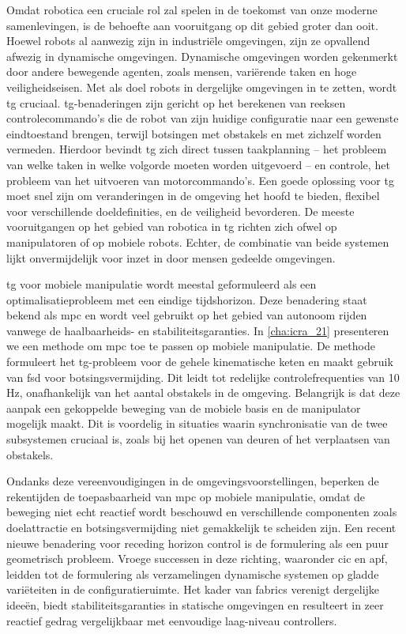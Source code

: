 \acresetall
Omdat robotica een cruciale rol zal spelen in de toekomst van onze moderne
samenlevingen, is de behoefte aan vooruitgang op dit gebied groter dan ooit.
Hoewel robots al aanwezig zijn in industriële omgevingen, zijn ze opvallend
afwezig in dynamische omgevingen. Dynamische omgevingen worden gekenmerkt door
andere bewegende agenten, zoals mensen, variërende taken en hoge
veiligheidseisen. Met als doel robots in dergelijke omgevingen in te zetten,
wordt \ac{tg} cruciaal. \Ac{tg}-benaderingen zijn gericht op het berekenen van
reeksen controlecommando's die de robot van zijn huidige configuratie naar een
gewenste eindtoestand brengen, terwijl botsingen met obstakels en met zichzelf
worden vermeden. Hierdoor bevindt \ac{tg} zich direct tussen taakplanning – het
probleem van welke taken in welke volgorde moeten worden uitgevoerd – en
controle, het probleem van het uitvoeren van motorcommando's. Een goede
oplossing voor \ac{tg} moet snel zijn om veranderingen in de omgeving het hoofd
te bieden, flexibel voor verschillende doeldefinities, en de veiligheid
bevorderen. De meeste vooruitgangen op het gebied van robotica in \ac{tg}
richten zich ofwel op manipulatoren of op mobiele robots. Echter, de combinatie
van beide systemen lijkt onvermijdelijk voor inzet in door mensen gedeelde
omgevingen.

\Ac{tg} voor mobiele manipulatie wordt meestal geformuleerd als een
optimalisatieprobleem met een eindige tijdshorizon. Deze benadering staat bekend
als \ac{mpc} en wordt veel gebruikt op het gebied van autonoom rijden vanwege de
haalbaarheids- en stabiliteitsgaranties. In \cref{cha:icra_21} presenteren we
een methode om \ac{mpc} toe te passen op mobiele manipulatie. De methode
formuleert het \ac{tg}-probleem voor de gehele kinematische keten en maakt
gebruik van \ac{fsd} voor botsingsvermijding. Dit leidt tot redelijke
controlefrequenties van 10 Hz, onafhankelijk van het aantal obstakels in de
omgeving. Belangrijk is dat deze aanpak een gekoppelde beweging van de mobiele
basis en de manipulator mogelijk maakt. Dit is voordelig in situaties waarin
synchronisatie van de twee subsystemen cruciaal is, zoals bij het openen van
deuren of het verplaatsen van obstakels.

Ondanks deze vereenvoudigingen in de omgevingsvoorstellingen, beperken de
rekentijden de toepasbaarheid van \ac{mpc} op mobiele manipulatie, omdat de
beweging niet echt reactief wordt beschouwd en verschillende componenten zoals
doelattractie en botsingsvermijding niet gemakkelijk te scheiden zijn. Een
recent nieuwe benadering voor receding horizon control is de formulering als een
puur geometrisch probleem. Vroege successen in deze richting, waaronder \ac{cic}
en \ac{apf}, leidden tot de formulering als verzamelingen dynamische systemen op
gladde variëteiten in de configuratieruimte. Het kader van \ac{fabrics}
verenigt dergelijke ideeën, biedt stabiliteitsgaranties in statische omgevingen
en resulteert in zeer reactief gedrag vergelijkbaar met eenvoudige laag-niveau
controllers.

